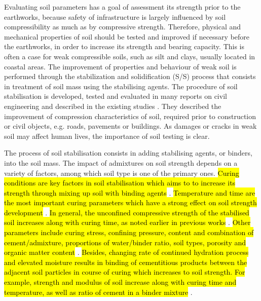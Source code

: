 \documentclass{amestyle}
\begin{document}
Evaluating soil parameters has a goal of assessment its strength prior to the earthworks, because safety of infrastructure is largely influenced by soil compressibility as much as by compressive strength. Therefore, physical and mechanical properties of soil should be tested and improved if necessary before the earthworks, in order to increase its strength and bearing capacity. This is often a case for weak compressible soils, such as silt and clays, usually located in coastal areas. The improvement of properties and behaviour of weak soil is performed through the stabilization and solidification (S/S) process that consists in treatment of soil mass using the stabilising agents. The procedure of soil stabilisation is developed, tested and evaluated in many reports on civil engineering and described in the existing studies \cite{Jauberthie,Lindh202102,ArabiWild,Lindh2004}. They described the improvement of compression characteristics of soil, required prior to construction or civil objects, e.g. roads, pavements or buildings. As damages or cracks in weak soil may affect human lives, the importance of soil testing is clear. 

The process of soil stabilisation consists in adding stabilising agents, or binders, into the soil mass. The impact of admixtures on soil strength depends on a variety of factors, among which soil type is one of the primary ones. \hl{Curing conditions are key factors in soil stabilisation which aims to to increase its strength through mixing up soil with binding agents} \cite{LiuStarcher,Oliveiraetal2012,Ghasemzadeh}. \hl{Temperature and time are the most important curing parameters which have a strong effect on soil strength development} \cite{Aldaood,Yuetal2017,Oh}. \hl{In general, the unconfined compressive strength of the stabilised soil increases along with curing time, as noted earlier in previous works} \cite{Howard,Lindh202102,Consoli}. \hl{Other parameters include curing stress, confining pressure, content and combination of cement/admixture, proportions of water/binder ratio, soil types, porosity and organic matter content} \cite{Rabbi,CHAIYAPUT2022e01082,Lindh2022,AMADI2018305}. \hl{Besides, changing rate of continued hydration process and elevated moisture results in binding of cementitious products between the adjacent soil particles in course of curing which increases to soil strength. For example, strength and modulus of soil increase along with curing time and temperature, as well as ratio of cement in a binder mixture} \cite{Wangetal2017}. 
\end{document}
